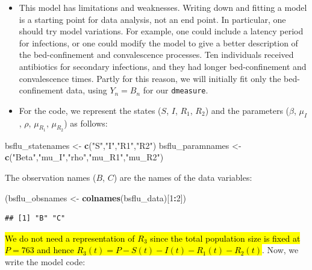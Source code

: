 \documentclass[]{article}
\newenvironment{Shaded}{\begin{snugshade}}{\end{snugshade}}
\newcommand{\KeywordTok}[1]{\textcolor[rgb]{0.13,0.29,0.53}{\textbf{#1}}}
\newcommand{\DecValTok}[1]{\textcolor[rgb]{0.00,0.00,0.81}{#1}}
\newcommand{\StringTok}[1]{\textcolor[rgb]{0.31,0.60,0.02}{#1}}
\newcommand{\OperatorTok}[1]{\textcolor[rgb]{0.81,0.36,0.00}{\textbf{#1}}}
\newcommand{\NormalTok}[1]{#1}
\begin{document}
\begin{itemize}
\item
  This model has limitations and weaknesses. Writing down and fitting a
  model is a starting point for data analysis, not an end point. In
  particular, one should try model variations. For example, one could
  include a latency period for infections, or one could modify the model
  to give a better description of the bed-confinement and convalescence
  processes. Ten individuals received antibiotics for secondary
  infections, and they had longer bed-confinement and convalescence
  times. Partly for this reason, we will initially fit only the
  bed-confinement data, using \(Y_n=B_n\) for our \texttt{dmeasure}.
\item
  For the code, we represent the states (\(S\), \(I\), \(R_1\), \(R_2\))
  and the parameters (\(\beta\), \(\mu_I\), \(\rho\), \(\mu_{R_1}\),
  \(\mu_{R_2}\)) as follows:
\end{itemize}

\begin{Shaded}
\begin{Highlighting}[]
\NormalTok{bsflu_statenames <-}\StringTok{ }\KeywordTok{c}\NormalTok{(}\StringTok{"S"}\NormalTok{,}\StringTok{"I"}\NormalTok{,}\StringTok{"R1"}\NormalTok{,}\StringTok{"R2"}\NormalTok{)}
\NormalTok{bsflu_paramnames <-}\StringTok{ }\KeywordTok{c}\NormalTok{(}\StringTok{"Beta"}\NormalTok{,}\StringTok{"mu_I"}\NormalTok{,}\StringTok{"rho"}\NormalTok{,}\StringTok{"mu_R1"}\NormalTok{,}\StringTok{"mu_R2"}\NormalTok{)}
\end{Highlighting}
\end{Shaded}

The observation names (\(B\), \(C\)) are the names of the data
variables:

\begin{Shaded}
\begin{Highlighting}[]
\NormalTok{(bsflu_obsnames <-}\StringTok{ }\KeywordTok{colnames}\NormalTok{(bsflu_data)[}\DecValTok{1}\OperatorTok{:}\DecValTok{2}\NormalTok{])}
\end{Highlighting}
\end{Shaded}

\begin{verbatim}
## [1] "B" "C"
\end{verbatim}

\hl{We do not need a representation of $R_3$ since the total population
size is fixed at $P=763$ and hence
$R_3(t)=P-S(t)-I(t)-R_1(t)-R_2(t)$}. Now, we write the model code:
\end{document}
